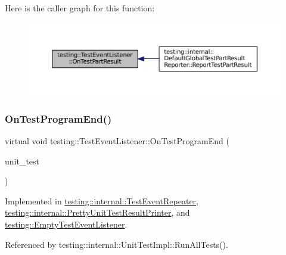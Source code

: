 Here is the caller graph for this function\+:
\nopagebreak
\begin{figure}[H]
\begin{center}
\leavevmode
\includegraphics[width=350pt]{classtesting_1_1TestEventListener_a054f8705c883fa120b91473aff38f2ee_icgraph}
\end{center}
\end{figure}
\mbox{\label{classtesting_1_1TestEventListener_ad15b6246d94c268e233487a86463ef3d}} 
\subsubsection{\texorpdfstring{On\+Test\+Program\+End()}{OnTestProgramEnd()}}
{\footnotesize\ttfamily virtual void testing\+::\+Test\+Event\+Listener\+::\+On\+Test\+Program\+End (\begin{DoxyParamCaption}\item[{const \hyperlink{classtesting_1_1UnitTest}{Unit\+Test} \&}]{unit\+\_\+test }\end{DoxyParamCaption})\hspace{0.3cm}{\ttfamily [pure virtual]}}



Implemented in \hyperlink{classtesting_1_1internal_1_1TestEventRepeater_a4622616259747dbcc23f5ee39ef99ec0}{testing\+::internal\+::\+Test\+Event\+Repeater}, \hyperlink{classtesting_1_1internal_1_1PrettyUnitTestResultPrinter_a8c92c062889abdb940b04ffe113f5980}{testing\+::internal\+::\+Pretty\+Unit\+Test\+Result\+Printer}, and \hyperlink{classtesting_1_1EmptyTestEventListener_a0abcc02bd2331a2e29ad6f4d9daf2a32}{testing\+::\+Empty\+Test\+Event\+Listener}.



Referenced by testing\+::internal\+::\+Unit\+Test\+Impl\+::\+Run\+All\+Tests().

